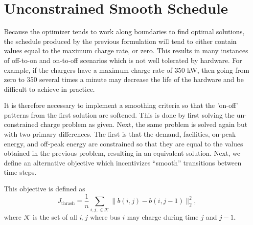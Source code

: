 \section{Unconstrained Smooth Schedule \label{sec:unconstrainedSmoothSchedule}}
Because the optimizer tends to work along boundaries to find optimal solutions, the schedule produced by the previous formulation will tend to either contain values equal to the maximum charge rate, or zero. This results in many instances of off-to-on and on-to-off scenarios which is not well tolerated by hardware.  For example, if the chargers have a maximum charge rate of 350 kW, then going from zero to 350 several times a minute may decrease the life of the hardware and be difficult to achieve in practice.
\par It is therefore necessary to implement a smoothing criteria so that the 'on-off' patterns from the first solution are softened. This is done by first solving the un-constrained charge problem as given. Next, the same problem is solved again but with two primary differences. The first is that the demand, facilities, on-peak energy, and off-peak energy are constrained so that they are equal to the values obtained in the previous problem, resulting in an equivalent solution. Next, we define an alternative objective which incentivizes ``smooth'' transitions between time steps. 
\par This objective is defined as
\begin{equation}\label{eqn:objective:smooth}
	J_{\text{thrash}} = \frac{1}{n}\sum_{i,j, \in \mathcal{K}}\lVert b(i,j) - b(i,j-1) \rVert^2_2,
\end{equation}
where $\mathcal{K}$ is the set of all $i,j$ where bus $i$ may charge during time $j$ and $j - 1$.

